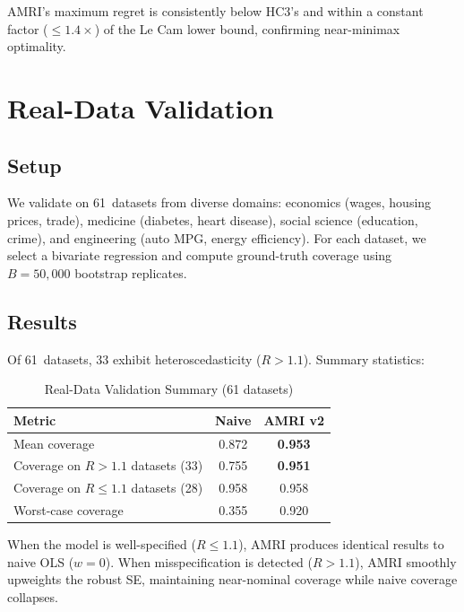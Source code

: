 \documentclass[12pt]{article}
\theoremstyle{definition}
\theoremstyle{remark}
\begin{document}
AMRI's maximum regret is consistently below HC3's and within a constant factor ($\leq 1.4\times$) of the Le Cam lower bound, confirming near-minimax optimality.


\section{Real-Data Validation}\label{sec:realdata}

\subsection{Setup}

We validate on 61~datasets from diverse domains: economics (wages, housing prices, trade), medicine (diabetes, heart disease), social science (education, crime), and engineering (auto MPG, energy efficiency). For each dataset, we select a bivariate regression and compute ground-truth coverage using $B = 50{,}000$ bootstrap replicates.

\subsection{Results}

Of 61~datasets, 33 exhibit heteroscedasticity ($R > 1.1$). Summary statistics:

\begin{table}[H]
\centering
\caption{Real-Data Validation Summary (61 datasets)}
\label{tab:realdata}
\begin{tabular}{lcc}
\toprule
Metric & Naive & AMRI v2 \\
\midrule
Mean coverage & 0.872 & \textbf{0.953} \\
Coverage on $R > 1.1$ datasets (33) & 0.755 & \textbf{0.951} \\
Coverage on $R \leq 1.1$ datasets (28) & 0.958 & 0.958 \\
Worst-case coverage & 0.355 & 0.920 \\
\bottomrule
\end{tabular}
\end{table}

When the model is well-specified ($R \leq 1.1$), AMRI produces identical results to naive OLS ($w = 0$). When misspecification is detected ($R > 1.1$), AMRI smoothly upweights the robust SE, maintaining near-nominal coverage while naive coverage collapses.
\end{document}
